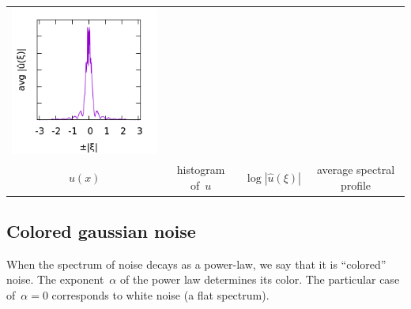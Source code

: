 \begin{tabular}{cccc}
	\includegraphics{s256_p.png} \\
	$u(x)$ &
	histogram of~$u$ &
	$\log|\hat u(\xi)|$ &
	average spectral profile
\end{tabular}



\subsection{Colored gaussian noise}

When the spectrum of noise decays as a power-law, we say that it is
``colored'' noise.  The exponent~$\alpha$ of the power law determines its
color.  The particular case of~$\alpha=0$ corresponds to white noise (a flat
spectrum).


